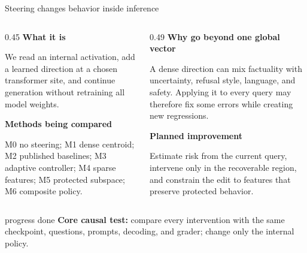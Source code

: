 \documentclass[aspectratio=169,11pt]{beamer}
\begin{document}
\begin{frame}{Steering changes behavior inside inference}
  \footnotesize
  \begin{columns}[T,onlytextwidth]
    \begin{column}{0.45\textwidth}
      \textbf{What it is}\par\vspace{0.15cm}
      We read an internal activation, add a learned direction at a chosen transformer site, and continue generation without retraining all model weights.\par\vspace{0.25cm}
      \textbf{Methods being compared}\par
      M0 no steering; M1 dense centroid; M2 published baselines; M3 adaptive controller; M4 sparse features; M5 protected subspace; M6 composite policy.
    \end{column}
    \begin{column}{0.49\textwidth}
      \textbf{Why go beyond one global vector}\par\vspace{0.15cm}
      A dense direction can mix factuality with uncertainty, refusal style, language, and safety. Applying it to every query may therefore fix some errors while creating new regressions.\par\vspace{0.25cm}
      \textbf{Planned improvement}\par
      Estimate risk from the current query, intervene only in the recoverable region, and constrain the edit to features that preserve protected behavior.
    \end{column}
  \end{columns}
  \vspace{0.18cm}
  \begin{beamercolorbox}[rounded=true,sep=0.3em]{progress done}
    \textbf{Core causal test:} compare every intervention with the same checkpoint, questions, prompts, decoding, and grader; change only the internal policy.
  \end{beamercolorbox}
\end{frame}
\end{document}
